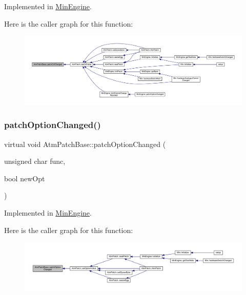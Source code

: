 Implemented in \hyperlink{class_min_engine_ad26e5e985eb56946ae93dc3274874229}{Min\+Engine}.

Here is the caller graph for this function\+:
\nopagebreak
\begin{figure}[H]
\begin{center}
\leavevmode
\includegraphics[width=350pt]{d4/deb/class_atm_patch_base_a10abe1d35a241d61a83473ef8caaee33_icgraph}
\end{center}
\end{figure}
\mbox{\label{class_atm_patch_base_ad31f8d45a0a630ee3052d69ee125e2f3}} 
\subsubsection{\texorpdfstring{patch\+Option\+Changed()}{patchOptionChanged()}}
{\footnotesize\ttfamily virtual void Atm\+Patch\+Base\+::patch\+Option\+Changed (\begin{DoxyParamCaption}\item[{unsigned char}]{func,  }\item[{bool}]{new\+Opt }\end{DoxyParamCaption})\hspace{0.3cm}{\ttfamily [pure virtual]}}



Implemented in \hyperlink{class_min_engine_aff5a85aae7d6f6e5edd571c73c071871}{Min\+Engine}.

Here is the caller graph for this function\+:
\nopagebreak
\begin{figure}[H]
\begin{center}
\leavevmode
\includegraphics[width=350pt]{d4/deb/class_atm_patch_base_ad31f8d45a0a630ee3052d69ee125e2f3_icgraph}
\end{center}
\end{figure}
\mbox{\label{class_atm_patch_base_ad561145330e0b53990f222c243ef5e89}} 
